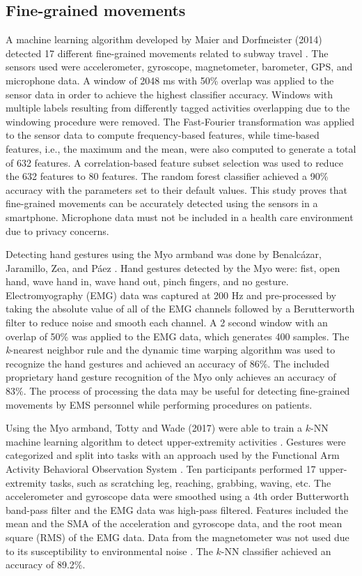 \subsection{Fine-grained movements}
A machine learning algorithm developed by Maier and Dorfmeister (2014) detected 17 different fine-grained movements related to subway travel \cite{Dorfmeister2014}. The sensors used were accelerometer, gyroscope, magnetometer, barometer, GPS, and microphone data. A window of 2048 ms with 50\% overlap was applied to the sensor data in order to achieve the highest classifier accuracy. Windows with multiple labels resulting from differently tagged activities overlapping due to the windowing procedure were removed. The Fast-Fourier transformation was applied to the sensor data to compute frequency-based features, while time-based features, i.e., the maximum and the mean, were also computed to generate a total of 632 features. A correlation-based feature subset selection was used to reduce the 632 features to 80 features. The random forest classifier achieved a 90\% accuracy with the parameters set to their default values. This study proves that fine-grained movements can be accurately detected using the sensors in a smartphone. Microphone data must not be included in a health care environment due to privacy concerns.
\par Detecting hand gestures using the Myo armband was done by Benalc{\'{a}}zar, Jaramillo, Zea, and P{\'{a}}ez \cite{Benalcazar2017}. Hand gestures detected by the Myo were: fist, open hand, wave hand in, wave hand out, pinch fingers, and no gesture. Electromyography (\gls{EMG}) data was captured at 200 Hz and pre-processed by taking the absolute value of all of the EMG channels followed by a Berutterworth filter to reduce noise and smooth each channel. A 2 second window with an overlap of 50\% was applied to the EMG data, which generates 400 samples. The \emph{k}-nearest neighbor rule and the dynamic time warping algorithm was used to recognize the hand gestures and achieved an accuracy of 86\%. The included proprietary hand gesture recognition of the Myo only achieves an accuracy of 83\%. The process of processing the data may be useful for detecting fine-grained movements by EMS personnel while performing procedures on patients.
\par Using the Myo armband, Totty and Wade (2017) were able to train a $k$-NN machine learning algorithm to detect upper-extremity activities \cite{Totty2017}. Gestures were categorized and split into tasks with an approach used by the Functional Arm Activity Behavioral Observation System \cite{FAABOS}. Ten participants performed 17 upper-extremity tasks, such as scratching leg, reaching, grabbing, waving, etc. The accelerometer and gyroscope data were smoothed using a 4th order Butterworth band-pass filter and the EMG data was high-pass filtered. Features included the mean and the \gls{SMA} of the acceleration and gyroscope data, and the root mean square (\gls{RMS}) of the \gls{EMG} data. Data from the magnetometer was not used due to its susceptibility to environmental noise \cite{Ahmad2013}. The $k$-NN classifier achieved an accuracy of 89.2\%.
